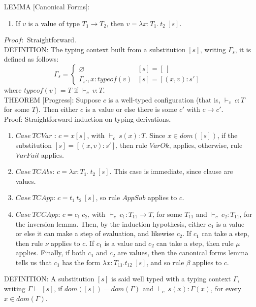 \documentclass {article}
\newcommand{\tto}{\longrightarrow}
\newcommand{\absD}{\lambda x:T_1. \ t_2}
\newcommand{\subx}{[(x,v):s']}
\newcommand{\env}{{\Gamma \vdash \ }}
\newcommand{\tyC}{{\vdash_c \ }}
\begin{document}
LEMMA [Canonical Forms]:
\begin{enumerate}
\item If $v$ is a value of type $T_1 \to T_2$, then $v = \absD \ [s]$.
\end{enumerate}
$Proof:$ Straightforward.\ \\

DEFINITION: The typing context built from a substitution $[s]$, writing $\Gamma_s$, it is defined as follows:
\[ \Gamma_s = \begin{cases} 
     \varnothing & [s] = [ \ ]\\
      \Gamma_{s'}, x:typeof(v) & [s] = \subx 
   \end{cases}
\]
where $typeof(v) = T$ if $\tyC v : T$. \ \\

THEOREM [Progress]: Suppose $c$ is a well-typed configuration (that is, $ \tyC c : T$ for some $T$). Then either $c$ is a value or else there is some $c'$ with $c \tto c'$. \ \\
Proof: Straightforward induction on typing derivations.
\begin{enumerate}
\item $Case \ TCVar$ : $c = x[s]$, with $\tyC s(x):T$. Since $x \in dom([s])$, if the substitution $[s] = \subx$, then rule $VarOk$, applies, otherwise, rule $VarFail$ applies.

\item $Case \ TCAbs$: $c = \absD \ [s]$. This case is immediate, since clause are values.

\item $Case \ TCApp$: $c = t_1 \ t_2 \ [s]$, so rule $AppSub$ applies to $c$.

\item $Case \ TCCApp$: $c = c_1 \ c_2$, with $\tyC c_1 : T_{11} \to T$, for some $T_{11}$ and $\tyC c_2 : T_{11}$, for the inversion lemma. Then, by the induction hypothesis, either $c_1$ is a value or else it can make a step of evaluation, and likewise $c_2$. If $c_1$ can take a step, then rule $\nu$ applies to $c$. If $c_1$ is a value and $c_2$ can take a step, then rule $\mu$ applies. Finally, if both $c_1$ and $c_2$ are values, then the canonical forms lemma tells us that $c_1$ has the form $\lambda x: T_{11}.t_{12} \ [s]$, and so rule $\beta$ applies to $c$.
\end{enumerate}

DEFINITION: A substitution $[s]$ is said well typed with a typing context $\Gamma$, writing $\env [s]$, if $dom([s]) = dom(\Gamma)$ and $ \tyC s(x):\Gamma(x)$, for every $x \in dom(\Gamma)$. \ \\
\end{document}
